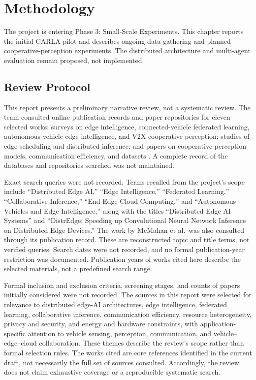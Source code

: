 \documentclass[12pt,a4paper,oneside]{report}
\begin{document}
\chapter{Methodology}

The project is entering Phase 3: Small-Scale Experiments. This chapter
reports the initial CARLA pilot and describes ongoing data gathering and
planned cooperative-perception experiments. The distributed architecture
and multi-agent evaluation remain proposed, not implemented.

\section{Review Protocol}

This report presents a preliminary narrative review, not a systematic
review. The team consulted online publication records and paper
repositories for eleven selected works: surveys on edge intelligence,
connected-vehicle federated learning, autonomous-vehicle edge intelligence,
and V2X cooperative perception; studies of edge scheduling and distributed
inference; and papers on cooperative-perception models, communication
efficiency, and datasets
\cite{deng2020,mcmahan2017,hu2023,hou2022,biswas2023,flcav2024,v2xvit2022,where2comm2022,opv2v2022,cobevt2023,v2xsurvey2025}.
A complete record of the
databases and repositories searched was not maintained.

Exact search queries were not recorded. Terms recalled from the project's
scope include ``Distributed Edge AI,'' ``Edge Intelligence,'' ``Federated
Learning,'' ``Collaborative Inference,'' ``End-Edge-Cloud Computing,'' and
``Autonomous Vehicles and Edge Intelligence,''
along with the titles ``Distributed Edge AI Systems'' and ``DistrEdge:
Speeding up Convolutional Neural Network Inference on Distributed Edge
Devices.'' The work by McMahan et al.\ was also consulted through its
publication record. These are reconstructed topic and title terms, not
verified queries. Search dates were not recorded, and no formal
publication-year restriction was documented. Publication years of works
cited here describe the selected materials, not a predefined search range.

Formal inclusion and exclusion criteria, screening stages, and counts of
papers initially considered were not recorded. The sources in this report
were selected for relevance to distributed edge-AI architectures, edge
intelligence, federated learning, collaborative inference, communication
efficiency, resource heterogeneity, privacy and security, and energy and
hardware constraints, with application-specific attention to vehicle
sensing, perception, communication, and vehicle--edge--cloud collaboration.
These themes describe the review's scope rather than
formal selection rules. The works cited are core references identified in
the current draft, not necessarily the full set of sources consulted.
Accordingly, the review does not claim exhaustive coverage or a reproducible
systematic search.
\end{document}
